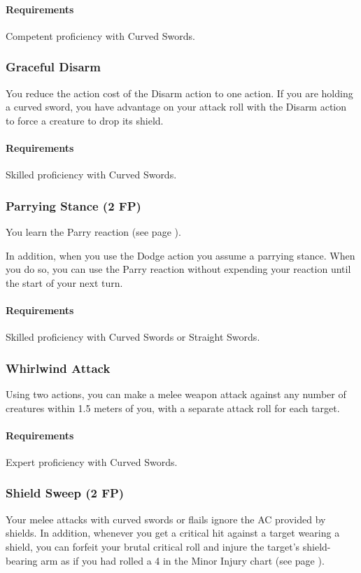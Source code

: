     \paragraph{Requirements} Competent proficiency with Curved Swords.
\subsubsection{Graceful Disarm} \label{feat::gracefuldisarm}
    You reduce the action cost of the Disarm action to one action.
    If you are holding a curved sword, you have advantage on your attack roll with the Disarm action to force a creature to drop its shield.
    \paragraph{Requirements} Skilled proficiency with Curved Swords.
\subsubsection{Parrying Stance (2 FP)} \label{feat::parryingstance}
    You learn the Parry reaction (see page \pageref{act::parry}).

    In addition, when you use the Dodge action you assume a parrying stance.
    When you do so, you can use the Parry reaction without expending your reaction until the start of your next turn.
    \paragraph{Requirements} Skilled proficiency with Curved Swords or Straight Swords.
\subsubsection{Whirlwind Attack} \label{feat::whirlwindattack}
    Using two actions, you can make a melee weapon attack against any number of creatures within 1.5 meters of you, with a separate attack roll for each target.
    \paragraph{Requirements} Expert proficiency with Curved Swords.
\subsubsection{Shield Sweep (2 FP)} \label{feat::shieldsweep}
    Your melee attacks with curved swords or flails ignore the AC provided by shields.
    In addition, whenever you get a critical hit against a target wearing a shield, you can forfeit your brutal critical roll and injure the target's shield-bearing arm as if you had rolled a 4 in the Minor Injury chart (see page \pageref{ssec::injuriesandinsanity}).
